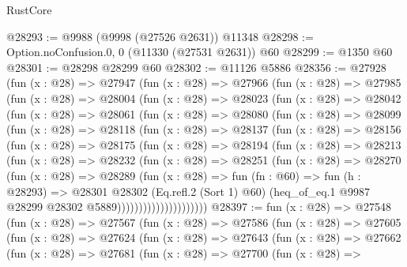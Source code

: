 \begin{lexlean}{RustCore}
\begin{coremodule}
@28293 := @9988 (@9998 (@27526 @2631)) @11348
@28298 := Option.noConfusion.{0, 0} (@11330 (@27531 @2631)) @60
@28299 := @1350 @60
@28301 := @28298 @28299 @60
@28302 := @11126 @5886
@28356 := @27928
    (fun (x : @28) =>
    @27947
      (fun (x : @28) =>
      @27966
        (fun (x : @28) =>
        @27985
          (fun (x : @28) =>
          @28004
            (fun (x : @28) =>
            @28023
              (fun (x : @28) =>
              @28042
                (fun (x : @28) =>
                @28061
                  (fun (x : @28) =>
                  @28080
                    (fun (x : @28) =>
                    @28099
                      (fun (x : @28) =>
                      @28118
                        (fun (x : @28) =>
                        @28137
                          (fun (x : @28) =>
                          @28156
                            (fun (x : @28) =>
                            @28175
                              (fun (x : @28) =>
                              @28194
                                (fun (x : @28) =>
                                @28213
                                  (fun (x : @28) =>
                                  @28232
                                    (fun (x : @28) =>
                                    @28251
                                      (fun (x : @28) =>
                                      @28270
                                        (fun (x : @28) =>
                                        @28289
                                          (fun (x : @28) =>
                                          fun (fn : @60) =>
                                          fun (h : @28293) =>
                                          @28301
                                            @28302
                                            (Eq.refl.{2} (Sort 1) @60)
                                            (heq_of_eq.{1}
                                              @9987
                                              @28299
                                              @28302
                                              @5889)))))))))))))))))))))
@28397 := fun (x : @28) =>
  @27548
    (fun (x : @28) =>
    @27567
      (fun (x : @28) =>
      @27586
        (fun (x : @28) =>
        @27605
          (fun (x : @28) =>
          @27624
            (fun (x : @28) =>
            @27643
              (fun (x : @28) =>
              @27662
                (fun (x : @28) =>
                @27681
                  (fun (x : @28) =>
                  @27700
                    (fun (x : @28) =>

\end{coremodule}
\end{lexlean}

